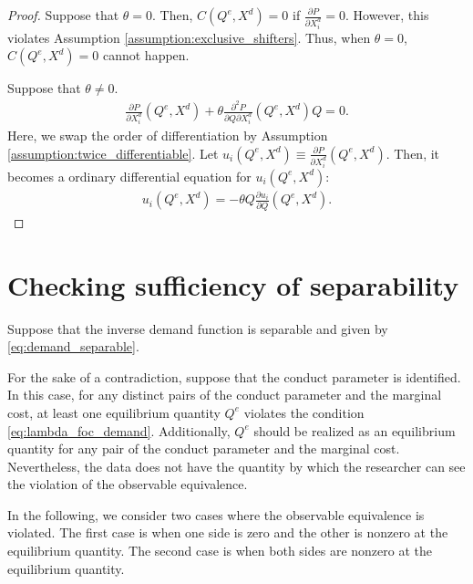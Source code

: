 \documentclass[11pt, a4paper]{article}
\theoremstyle{remark}
\begin{document}
\begin{proof}
    Suppose that $\theta = 0$.
    Then, $C(Q^e, X^{d}) = 0$ if $\frac{\partial P}{\partial X^{d}_{i}} =  0$.
    However, this violates Assumption \ref{assumption:exclusive_shifters}.
    Thus, when $\theta = 0$, $C(Q^e, X^{d}) = 0$ cannot happen.


    Suppose that $\theta \ne 0$.
    \begin{align}
        \frac{\partial P}{\partial X^{d}_i}(Q^e, X^{d}) + \theta\frac{\partial^2 P}{\partial Q\partial X^{d}_{i}}(Q^e, X^{d})Q = 0.
    \end{align}
    Here, we swap the order of differentiation by Assumption \ref{assumption:twice_differentiable}.
    Let $u_i(Q^e, X^{d}) \equiv \frac{\partial P}{\partial X^{d}_i}(Q^e, X^{d})$.
    Then, it becomes a ordinary differential equation for $u_i(Q^e, X^{d})$:
    \begin{align}
       u_i(Q^e, X^{d}) = -\theta Q\frac{\partial u_i}{\partial Q}(Q^e, X^{d}).
    \end{align}



\end{proof}

















\section{Checking sufficiency of separability}

Suppose that the inverse demand function is separable and given by \eqref{eq:demand_separable}.

For the sake of a contradiction, suppose that the conduct parameter is identified.
In this case, for any distinct pairs of the conduct parameter and the marginal cost, at least one equilibrium quantity $Q^e$ violates the condition \eqref{eq:lambda_foc_demand}.
Additionally, $Q^e$ should be realized as an equilibrium quantity for any pair of the conduct parameter and the marginal cost.
Nevertheless, the data does not have the quantity by which the researcher can see the violation of the observable equivalence.

In the following, we consider two cases where the observable equivalence is violated.
The first case is when one side is zero and the other is nonzero at the equilibrium quantity.
The second case is when both sides are nonzero at the equilibrium quantity.
\end{document}
